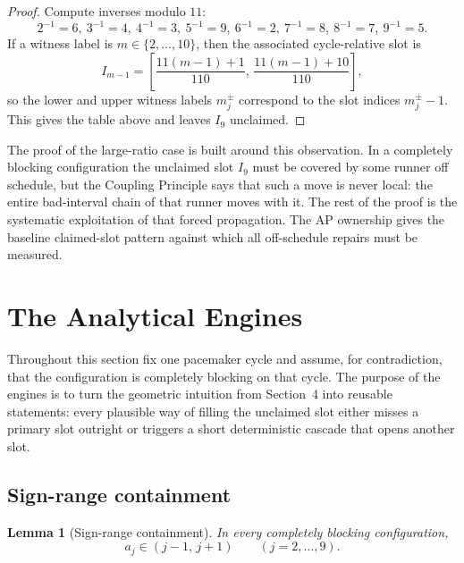 \documentclass[12pt,a4paper]{amsart}
\newtheorem{lemma}[theorem]{Lemma}
\theoremstyle{definition}
\theoremstyle{remark}
\begin{document}
\begin{proof}
Compute inverses modulo $11$:
\[
  2^{-1}=6,\ 3^{-1}=4,\ 4^{-1}=3,\ 5^{-1}=9,\ 6^{-1}=2,\ 7^{-1}=8,\ 8^{-1}=7,\ 9^{-1}=5.
\]
If a witness label is $m\in\{2,\ldots,10\}$, then the associated cycle-relative slot is
\[
  I_{m-1} = \left[\frac{11(m-1)+1}{110},\,\frac{11(m-1)+10}{110}\right],
\]
so the lower and upper witness labels $m_j^\pm$ correspond to the slot indices $m_j^\pm-1$.
This gives the table above and leaves $I_9$ unclaimed.
\end{proof}

The proof of the large-ratio case is built around this observation. In a completely blocking
configuration the unclaimed slot $I_9$ must be covered by some runner off schedule, but
the Coupling Principle says that such a move is never local: the entire bad-interval chain
of that runner moves with it. The rest of the proof is the systematic exploitation of that
forced propagation. The AP ownership gives the baseline claimed-slot pattern against which
all off-schedule repairs must be measured.

\section{The Analytical Engines}

Throughout this section fix one pacemaker cycle and assume, for contradiction, that the
configuration is completely blocking on that cycle. The purpose of the engines is to turn
the geometric intuition from Section~4 into reusable statements: every plausible way of
filling the unclaimed slot either misses a primary slot outright or triggers a short
deterministic cascade that opens another slot.

\subsection{Sign-range containment}

\begin{lemma}[Sign-range containment]\label{lem:sign-range}
In every completely blocking configuration,
\[
  a_j \in (j-1,\,j+1)\qquad(j=2,\ldots,9).
\]
\end{lemma}
\end{document}

